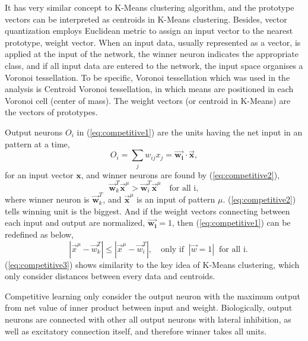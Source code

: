 \documentclass[12pt,a4paper]{report}
\begin{document}
\bigskip
It has very similar concept to K-Means clustering algorithm, and the prototype vectors can be interpreted as centroids in K-Means clustering. Besides, vector quantization employs Euclidean metric to assign an input vector to the nearest prototype, weight vector. When an input data, usually represented as a vector, is applied at the input of the network, the winner neuron indicates the appropriate class, and if all input data are entered to the network, the input space organises a Voronoi tessellation. To be specific, Voronoi tessellation which was used in the analysis is Centroid Voronoi tessellation, in which means are positioned in each Voronoi cell (center of mass). The weight vectors (or centroid in K-Means) are the vectors of prototypes. 

\bigskip
Output neurons $O_i$ in (\ref{eq:competitive1}) are the units having the net input in an pattern at a time,
\begin{equation}\label{eq:competitive1}
    O_i = \sum_j w_{ij}x_j = \vec{\mathbf{w_i}} \cdot \vec{\mathbf{x}},
\end{equation}
for an input vector $\mathbf{x}$, and winner neurons are found by (\ref{eq:competitive2}),
\begin{equation} \label{eq:competitive2}
    \vec{\mathbf{w}}_k^T\vec{\mathbf{x}}^\mu > \vec{\mathbf{w}}_i^T\vec{\mathbf{x}}^\mu \quad \textrm{for all i},
\end{equation}
where winner neuron is $\vec{\mathbf{w}}_k^T$, and $\vec{\mathbf{x}}^\mu$ is an input of pattern $\mu$.
(\ref{eq:competitive2}) tells winning unit is the biggest.
And if the weight vectors connecting between each input and output are normalized, $\vec{\mathbf{w_i}}=1$, then (\ref{eq:competitive1}) can be redefined as below,
\begin{equation} \label{eq:competitive3}
    \quad |\vec{x}^\mu - \vec{w}_k^T| \leq |\vec{x}^\mu - \vec{w}_i^T|, \quad
    \textrm{only if} \;\; |\vec{w}=1| \;\; \textrm{for all i.}
\end{equation}
(\ref{eq:competitive3}) shows similarity to the key idea of K-Means clustering, which only consider distances between every data and centroids.

\bigskip
Competitive learning only consider the output neuron with the maximum output from net value of inner product between input and weight. Biologically, output neurons are connected with other all output neurons with lateral inhibition, as well as excitatory connection itself, and therefore winner takes all units.
\end{document}
